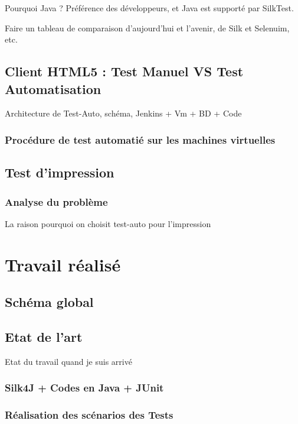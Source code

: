 \documentclass[12pt]{article}
\begin{document}
    \par Pourquoi Java ? Préférence des développeurs, et Java est supporté par SilkTest.
    
    \par Faire un tableau de comparaison d'aujourd'hui et l'avenir, de Silk et Selenuim, etc.


\subsection{Client HTML5 : Test Manuel VS Test Automatisation}
Architecture de Test-Auto, schéma, Jenkins + Vm + BD + Code
\subsubsection{Procédure de test automatié sur les machines virtuelles}

\subsection{Test d'impression}
    \subsubsection{Analyse du problème}
    La raison pourquoi on choisit test-auto pour l'impression

\newpage
\section{Travail réalisé}
\subsection{Schéma global}

    \subsection{Etat de l'art}
    Etat du travail quand je suis arrivé
    \subsubsection{Silk4J + Codes en Java + JUnit}
    
    \subsubsection{Réalisation des scénarios des Tests}
\end{document}
